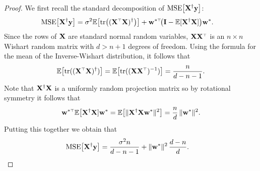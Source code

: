 \documentclass[11pt]{article}
\begin{document}
\begin{proof} 
  We first recall the standard decomposition of ${\mathrm{MSE}\big[\mathbf X^\dagger \mathbf y\big]}$:
  \begin{align*}
    \MSE{\X^\dagger \y}
    &=\sigma^2 \E\big[\tr\big((\X^\top \X)^\dagger \big)\big]+
      \w^{*\top}\!\big( \I - \E[\X^\dagger \X]\big) \w^*. 
  \end{align*}
  Since the rows of $\mathbf X$ are standard normal random variables,
  $\X\X^\top$ is an $n\times n$ Wishart random matrix with $d>n+1$ degrees
  of freedom. Using the formula for the mean of the Inverse-Wishart
  distribution, it follows that
  \begin{align*}
\E\big[\tr((\X^\top\X)^\dagger)\big] = \E\big[\tr((\X\X^\top)^{-1})\big]= \frac{n}{d - n - 1}.
  \end{align*}
Note that $\mathbf X^\dagger\mathbf X$ is a uniformly random projection matrix so by
rotational symmetry it follows that
\begin{align*}
  \w^{*\top}\E\big[\X^\dagger\X]\w^* =
  \E\big[\|\X^\dagger\X\w^*\|^2\big] = \frac nd \,\|\w^*\|^2.
\end{align*}
Putting this together we obtain that
  \begin{align*}
    {\mathrm{MSE}\big[\mathbf X^\dagger \mathbf y\big]}
    &=\frac{\sigma^2 n}{d - n - 1}+ \|\mathbf w^*\|^2\,\frac{d - n}{d}.
  \end{align*}

\end{proof}
\end{document}
